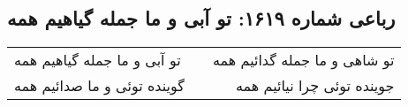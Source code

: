 \begin{center}
\section*{رباعی شماره ۱۶۱۹: تو آبی و ما جمله گیاهیم همه}
\label{sec:1619}
\begin{longtable}{l p{0.5cm} r}
تو آبی و ما جمله گیاهیم همه
&&
تو شاهی و ما جمله گدائیم همه
\\
گوینده توئی و ما صدائیم همه
&&
جوینده توئی چرا نیائیم همه
\\
\end{longtable}
\end{center}
